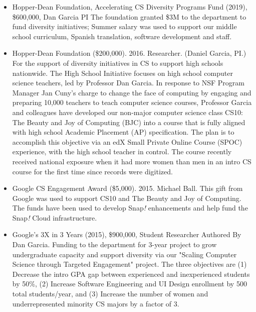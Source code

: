 \begin{itemize}
    \item{Hopper-Dean Foundation, Accelerating CS Diversity Programs Fund (2019), \$600,000, Dan Garcia PI
    The foundation granted \$3M to the department to fund diversity initiatives;  Summer salary was used to support our middle school curriculum, Spanish translation, software development and staff.
    }

    \item{Hopper-Dean Foundation (\$200,000). 2016. Researcher. (Daniel Garcia, PI.)}
    \newline\small{For the support of diversity initiatives in CS to support high schools nationwide. The High School Initiative focuses on high school computer science teachers, led by Professor Dan Garcia. In response to NSF Program Manager Jan Cuny’s charge to change the face of computing by engaging and preparing 10,000 teachers to teach computer science courses, Professor Garcia and colleagues have developed our non-major computer science class CS10: The Beauty and Joy of Computing (BJC) into a course that is fully aligned with high school Academic Placement (AP) specification. The plan is to accomplish this objective via an edX Small Private Online Course (SPOC) experience, with the high school teacher in control. The course recently received national exposure when it had more women than men in an intro CS course for the first time since records were digitized.}

    \item{Google CS Engagement Award (\$5,000). 2015. Michael Ball.}
    \newline\small{This gift from Google was used to support CS10 and The Beauty and Joy of Computing. The funds have been used to develop Snap\textit{!} enhancements and help fund the Snap\textit{!} Cloud infrastructure.}
    
    \item{Google’s 3X in 3 Years (2015), \$900,000, Student  Researcher
    Authored By Dan Garcia. Funding to the department for 3-year project to grow undergraduate capacity and support diversity via our "Scaling Computer Science through Targeted Engagement" project. The three objectives are (1) Decrease the intro GPA gap between experienced and inexperienced students by 50\%, (2) Increase Software Engineering and UI Design enrollment by 500 total students/year, and (3) Increase the number of women and underrepresented minority CS majors by a factor of 3.}
    

\end{itemize}
